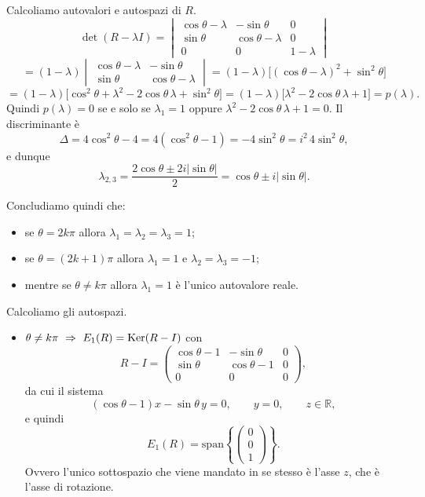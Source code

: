 \begin{example}{}
\inizioapprof Calcoliamo autovalori e autospazi di $R$.
\[
\det(R-\lambda I)=
\begin{vmatrix}
\cos\theta-\lambda & -\sin\theta & 0\\
\sin\theta & \cos\theta-\lambda & 0\\
0 & 0 & 1-\lambda
\end{vmatrix}
\]
\[
=(1-\lambda)
\begin{vmatrix}
\cos\theta-\lambda & -\sin\theta\\
\sin\theta & \cos\theta-\lambda
\end{vmatrix}
=(1-\lambda)\bigl[(\cos\theta-\lambda)^2+\sin^2\theta\bigr]
\]
\[
=(1-\lambda)\bigl[\cos^2\theta+\lambda^2-2\cos\theta\,\lambda+\sin^2\theta\bigr]
=(1-\lambda)\bigl[\lambda^2-2\cos\theta\,\lambda+1\bigr]
=p(\lambda).
\]
Quindi $p(\lambda)=0$ se e solo se $\lambda_1=1$ oppure $\lambda^2-2\cos\theta\,\lambda+1=0$.
Il discriminante è
\[
\Delta=4\cos^2\theta-4=4(\cos^2\theta-1)=-4\sin^2\theta=i^2\,4\sin^2\theta,
\]
e dunque
\[
\lambda_{2,3}=\frac{2\cos\theta\pm 2i|\sin\theta|}{2}
=\cos\theta\pm i|\sin\theta|.
\]

Concludiamo quindi che:
\begin{itemize}
\item se $\theta=2k\pi$ allora $\lambda_1=\lambda_2=\lambda_3=1$;
\item se $\theta=(2k+1)\pi$ allora $\lambda_1=1$ e $\lambda_2=\lambda_3=-1$;
\item mentre se $\theta\neq k\pi$ allora $\lambda_1=1$ è l'unico autovalore reale.
\end{itemize}

Calcoliamo gli autospazi.
\begin{itemize}
\item $\theta\neq k\pi \ \Rightarrow\ E_1(R)=\Ker(R-I)$ con
\[
R-I=
\begin{pmatrix}
\cos\theta-1 & -\sin\theta & 0\\
\sin\theta & \cos\theta-1 & 0\\
0 & 0 & 0
\end{pmatrix},
\]
da cui il sistema
\[
(\cos\theta-1)x-\sin\theta\,y=0,\qquad y=0,\qquad z\in\mathbb{R},
\]
e quindi
\[
E_1(R)=\mathrm{span}\!\left\{\begin{pmatrix}0\\0\\1\end{pmatrix}\right\}.
\]
Ovvero l'unico sottospazio che viene mandato in se stesso è l'asse $z$, che è l'asse di rotazione.


\end{itemize}
\end{example}
